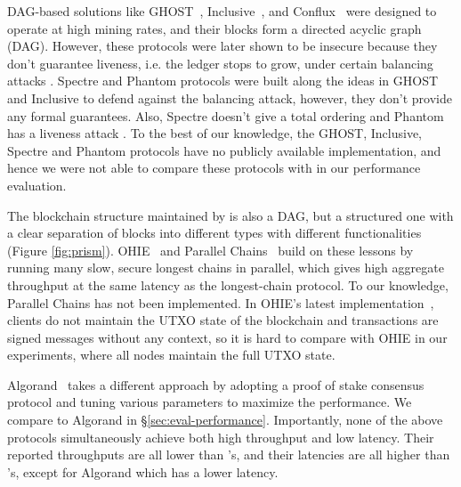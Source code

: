 DAG-based solutions like GHOST~\cite{ghost}, Inclusive~\cite{inclusive}, and Conflux~\cite{conflux} were designed to operate at high mining rates, and their blocks form a directed acyclic graph (DAG). 
However, these protocols were later shown to be insecure because they don't guarantee liveness, i.e. the ledger stops to grow, under certain balancing attacks \cite{ghost_attack}. Spectre\cite{spectre} and Phantom \cite{phantom} protocols were built along the ideas in GHOST and Inclusive to defend against the balancing attack, however, they don't provide any formal guarantees. Also, Spectre doesn't give a total ordering and
Phantom has a liveness attack \cite{conflux}.
To the best of our knowledge, the GHOST, Inclusive, Spectre and Phantom protocols have no publicly available implementation, and hence we were not able to compare these protocols with \prism in our performance evaluation. 

The blockchain structure maintained by \prism is also a DAG, but a structured one with a clear separation of blocks into different types with different functionalities (Figure \ref{fig:prism}). 
OHIE~\cite{ohie} and Parallel Chains~\cite{parallel} build on these lessons by running many slow, secure longest chains in parallel, which gives high aggregate throughput at the same latency as the longest-chain protocol. To our knowledge, Parallel Chains has not been implemented. 
In OHIE's latest implementation~\cite{ohiecode}, clients do not maintain the UTXO state of the blockchain and  transactions are signed messages without any context, so it is hard to compare with OHIE in our experiments, where all nodes maintain the full UTXO state.

Algorand~\cite{algorand} takes a different approach by adopting a proof of stake consensus protocol and tuning various parameters to maximize the performance. We compare to Algorand in \S\ref{sec:eval-performance}. Importantly, none of the above protocols simultaneously achieve both high throughput and low latency. 
Their reported throughputs are all lower than \prism's, and their latencies are all higher than \prism's, except for Algorand which has a lower latency.





